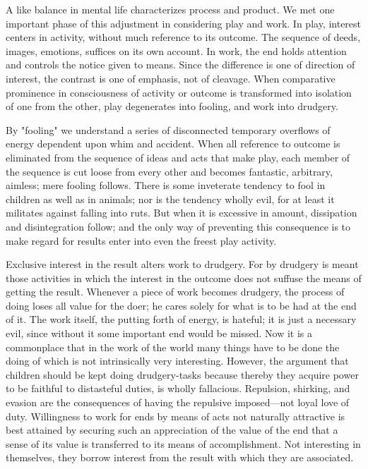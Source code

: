 \documentclass[showtrims,ustradepaper]{memoir}
\begin{document}
A like balance in mental life characterizes process and product. We met
one important phase of this adjustment in considering play and work. In
play, interest centers in activity, without much reference to its
outcome. The sequence of deeds, images, emotions, suffices on its own
account. In work, the end holds attention and controls the notice given
to means. Since the difference is one of direction of interest, the
contrast is one of emphasis, not of cleavage. When comparative
prominence in consciousness of activity or outcome is transformed into
isolation of one from the other, play degenerates into fooling, and work
into drudgery.


By "fooling" we understand a series of disconnected temporary overflows
of energy dependent upon whim and accident. When all reference to
outcome is eliminated from the sequence of ideas and acts that make
play, each member of the sequence is cut loose from every other and
becomes fantastic, arbitrary, aimless; mere fooling follows. There is
some inveterate tendency to fool in children as well as in animals; nor
is the tendency wholly evil, for at least it militates against falling
into ruts. But when it is excessive in amount, dissipation and
disintegration follow; and the only way of preventing this consequence
is to make regard for results enter into even the freest play
activity.


Exclusive interest in the result alters work to drudgery. For by
drudgery is meant those activities in which the interest in the outcome
does not suffuse the means of getting the result. Whenever a piece of
work becomes drudgery, the process of doing loses all value for the
doer; he cares solely for what is to be had at the end of it. The work
itself, the putting forth of energy, is hateful; it is just a necessary
evil, since without it some important end would be missed. Now it is a
commonplace that in the work of the world many things have to be done
the doing of which is not intrinsically very interesting. However, the
argument that children should be kept doing drudgery-tasks because
thereby they acquire power to be faithful to distasteful duties, is
wholly fallacious. Repulsion, shirking, and evasion are the consequences
of having the repulsive imposed---not loyal love of duty. Willingness to
work for ends by means of acts not naturally attractive is best attained
by securing such an appreciation of the value of the end that a sense of
its value is transferred to its means of accomplishment. Not interesting
in themselves, they borrow interest from the result with which they are
associated.
\end{document}

